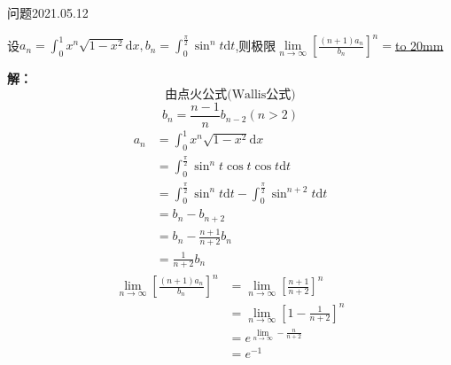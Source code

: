 \begin{mybox}{问题2021.05.12}
	
	\qquad 设$a_n=\int_{0}^{1} x^n \sqrt{1-x^2}\mathrm{d}x,b_n=\int_{0}^{\frac{\pi}{2}}\sin^n t\mathrm{d}t$,则极限$\lim\limits_{n\to \infty}\left[\frac{(n+1)a_n}{b_n} \right]^n=$\underline{\hbox to 20mm{}}
\end{mybox}
\noindent
\textbf{解：}
$$\text{由点火公式(Wallis公式)}$$
$$b_n=\frac{n-1}{n}b_{n-2}(n>2)$$
\begin{align*}
	a_n&=\int_{0}^{1} x^n \sqrt{1-x^2}\mathrm{d}x\\
	   &=\int_{0}^{\frac{\pi}{2}}\sin^n t \cos t \cos t \mathrm{d}t\\ 
	   &=\int_{0}^{\frac{\pi}{2}}\sin^n t \mathrm{d}t-\int_{0}^{\frac{\pi}{2}}\sin^{n+2} t\mathrm{d}t\\
	   &=b_n-b_{n+2}\\
	   &=b_n-\frac{n+1}{n+2}b_n\\
	   &=\frac{1}{n+2}b_n
\end{align*}
\begin{align*}
	\lim\limits_{n\to \infty}\left[\frac{(n+1)a_n}{b_n} \right]^n&=\lim \limits_{n\to \infty} \left[\frac{n+1}{n+2}\right]^n\\
	&=\lim\limits_{n\to\infty} \left[1-\frac{1}{n+2}\right]^n\\
	&=e^{\lim\limits_{n\to\infty} -\frac{n}{n+2}}\\
	&=e^{-1}
\end{align*}